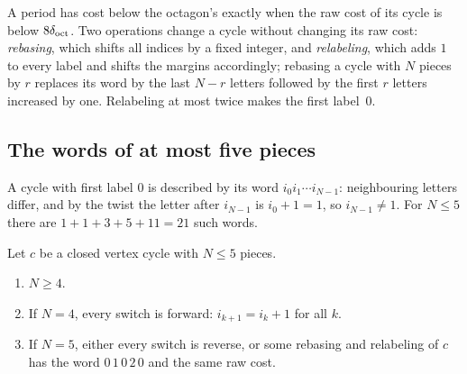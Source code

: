 A period has cost below the octagon's exactly when the raw cost of its cycle is below $8\delta_{\mathrm{oct}}$.
Two operations change a cycle without changing its raw cost: \emph{rebasing}, which shifts all
indices by a fixed integer, and \emph{relabeling}, which adds $1$ to every label and shifts the
margins accordingly; rebasing a cycle with $N$ pieces by $r$ replaces its word by the last $N-r$
letters followed by the first $r$ letters increased by one. Relabeling at most twice makes the
first label~$0$.

\subsection{The words of at most five pieces}\label{sec:terminal-words}

A cycle with first label $0$ is described by its word $i_0i_1\cdots i_{N-1}$: neighbouring
letters differ, and by the twist the letter after $i_{N-1}$ is $i_0+1=1$, so $i_{N-1}\ne1$.
For $N\le5$ there are $1+1+3+5+11=21$ such words.

\begin{proposition}\label{prop:terminal-words}
Let $c$ be a closed vertex cycle with $N\le5$ pieces.
\begin{enumerate}
\item $N\ge4$.
\item If $N=4$, every switch is forward: $i_{k+1}=i_k+1$ for all $k$.
\item If $N=5$, either every switch is reverse, or some rebasing and relabeling of $c$ has the
 word $0\,1\,0\,2\,0$ and the same raw cost.
\end{enumerate}
\end{proposition}

